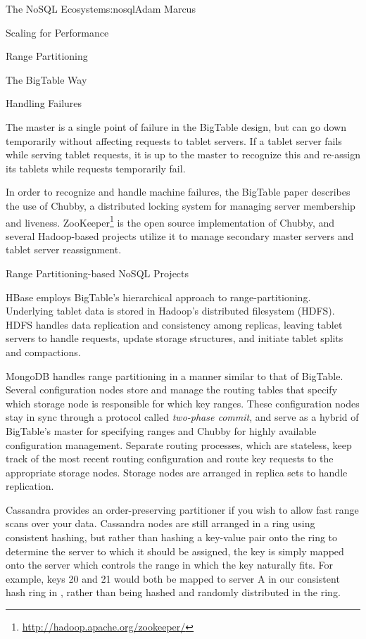 \begin{aosachapter}{The NoSQL Ecosystem}{s:nosql}{Adam Marcus}
\begin{aosasect1}{Scaling for Performance}
\begin{aosasect2}{Range Partitioning}
\begin{aosasect3}{The BigTable Way}
\end{aosasect3}

\vspace{-0.1cm} %
\begin{aosasect3}{Handling Failures}

The master is a single point of failure in the BigTable design, but
can go down temporarily without affecting requests to tablet servers.
If a tablet server fails while serving tablet requests, it is up to
the master to recognize this and re-assign its tablets while requests
temporarily fail.

In order to recognize and handle machine failures, the BigTable paper
describes the use of Chubby, a distributed locking system for managing
server membership and liveness.
ZooKeeper\footnote{\url{http://hadoop.apache.org/zookeeper/}} is the
open source implementation of Chubby, and several Hadoop-based
projects utilize it to manage secondary master servers and tablet
server reassignment.

\end{aosasect3}

\begin{aosasect3}{Range Partitioning-based NoSQL Projects}

HBase employs BigTable's hierarchical approach to range-partitioning.
Underlying tablet data is stored in Hadoop's distributed filesystem
(HDFS).  HDFS handles data replication and consistency among replicas,
leaving tablet servers to handle requests, update storage structures,
and initiate tablet splits and compactions.

MongoDB handles range partitioning in a manner similar to that of
BigTable.  Several configuration nodes store and manage the routing
tables that specify which storage node is responsible for which key
ranges.  These configuration nodes stay in sync through a protocol
called \emph{two-phase commit}, and serve as a hybrid of BigTable's
master for specifying ranges and Chubby for highly available
configuration management.  Separate routing processes, which are
stateless, keep track of the most recent routing configuration and
route key requests to the appropriate storage nodes.  Storage nodes
are arranged in replica sets to handle replication.

Cassandra provides an order-preserving partitioner if you wish to
allow fast range scans over your data.  Cassandra nodes are still arranged
in a ring using consistent hashing, but rather than hashing a
key-value pair onto the ring to determine the server to which it
should be assigned, the key is simply mapped onto the server which
controls the range in which the key naturally fits.  For example, keys
20 and 21 would both be mapped to server A in our consistent hash ring
in , rather than being hashed and
randomly distributed in the ring.


\end{aosasect3}
\end{aosasect2}
\end{aosasect1}
\end{aosachapter}

